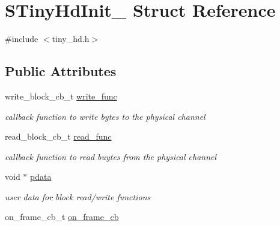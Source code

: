 \hypertarget{structSTinyHdInit__}{}\section{S\+Tiny\+Hd\+Init\+\_\+ Struct Reference}
\label{structSTinyHdInit__}


{\ttfamily \#include $<$tiny\+\_\+hd.\+h$>$}

\subsection*{Public Attributes}
\begin{DoxyCompactItemize}
\item 
\hypertarget{structSTinyHdInit___a0bd05a4fc43236ff37d67aec4d2a0952}{}write\+\_\+block\+\_\+cb\+\_\+t \hyperlink{structSTinyHdInit___a0bd05a4fc43236ff37d67aec4d2a0952}{write\+\_\+func}\label{structSTinyHdInit___a0bd05a4fc43236ff37d67aec4d2a0952}

\begin{DoxyCompactList}\small\item\em callback function to write bytes to the physical channel \end{DoxyCompactList}\item 
\hypertarget{structSTinyHdInit___a5de352b11ca7915737bc459cde7c566d}{}read\+\_\+block\+\_\+cb\+\_\+t \hyperlink{structSTinyHdInit___a5de352b11ca7915737bc459cde7c566d}{read\+\_\+func}\label{structSTinyHdInit___a5de352b11ca7915737bc459cde7c566d}

\begin{DoxyCompactList}\small\item\em callback function to read buytes from the physical channel \end{DoxyCompactList}\item 
\hypertarget{structSTinyHdInit___a7b6be4e09ea04eaa4372eadce4d51055}{}void $\ast$ \hyperlink{structSTinyHdInit___a7b6be4e09ea04eaa4372eadce4d51055}{pdata}\label{structSTinyHdInit___a7b6be4e09ea04eaa4372eadce4d51055}

\begin{DoxyCompactList}\small\item\em user data for block read/write functions \end{DoxyCompactList}\item 
\hypertarget{structSTinyHdInit___ae2eea5181620dfbb47b60a5073bd5ed2}{}on\+\_\+frame\+\_\+cb\+\_\+t \hyperlink{structSTinyHdInit___ae2eea5181620dfbb47b60a5073bd5ed2}{on\+\_\+frame\+\_\+cb}\label{structSTinyHdInit___ae2eea5181620dfbb47b60a5073bd5ed2}


\end{DoxyCompactItemize}
